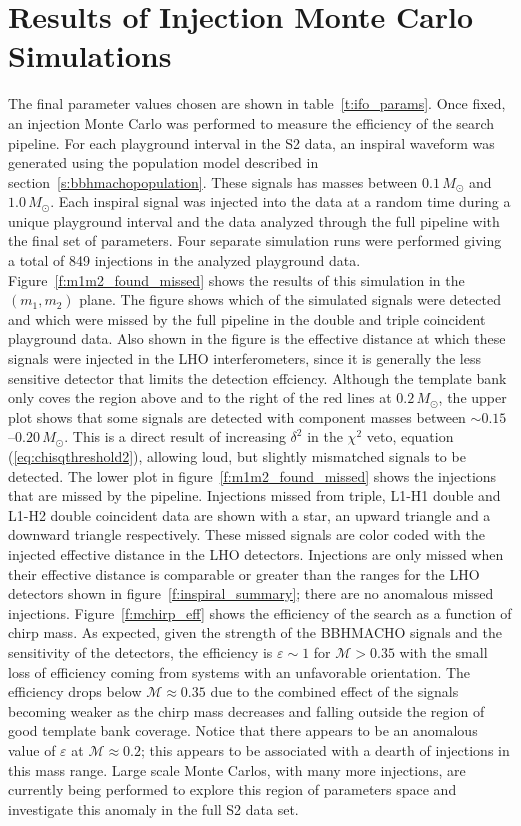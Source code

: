 \section{Results of Injection Monte Carlo Simulations}
\label{s:monte}

The final parameter values chosen are shown in table~\ref{t:ifo_params}. Once
fixed, an injection Monte Carlo was performed to measure the efficiency of the
search pipeline. For each playground interval in the S2 data, an inspiral
waveform was generated using the population model described in
section~\ref{s:bbhmachopopulation}. These signals has masses between
$0.1\,M_\odot$ and $1.0\,M_\odot$. Each inspiral signal was injected into the
data at a random time during a unique playground interval and the data
analyzed through the full pipeline with the final set of parameters. Four
separate simulation runs were performed giving a total of 849 injections in
the analyzed playground data.  Figure~\ref{f:m1m2_found_missed} shows the
results of this simulation in the $(m_1,m_2)$ plane. The figure shows which of
the simulated signals were detected and which were missed by the full pipeline
in the double and triple coincident playground data. Also shown in the figure
is the effective distance at which these signals were injected in the LHO
interferometers, since it is generally the less sensitive detector that limits
the detection effciency.  Although the template bank only coves the region
above and to the right of the red lines at $0.2\,M_\odot$, the upper plot
shows that some signals are detected with component masses between $\sim
0.15$--$0.20\,M_\odot$. This is a direct result of increasing $\delta^2$ in
the $\chi^2$ veto, equation (\ref{eq:chisqthreshold2}), allowing loud, but
slightly mismatched signals to be detected. The lower plot in
figure~\ref{f:m1m2_found_missed} shows the injections that are missed by
the pipeline. Injections missed from triple, L1-H1 double and L1-H2 double
coincident data are shown with a star, an upward triangle and a downward
triangle respectively. These missed signals are color coded with the injected
effective distance in the LHO detectors. Injections are
only missed when their effective distance is comparable or greater than the
ranges for the LHO detectors shown in figure~\ref{f:inspiral_summary}; there
are no anomalous missed injections.  Figure~\ref{f:mchirp_eff} shows the
efficiency of the search as a function of chirp mass. As expected, given the
strength of the BBHMACHO signals and the sensitivity of the detectors, the
efficiency is $\varepsilon \sim 1$ for $\mathcal{M} >0.35$ with the small loss
of efficiency coming from systems with an unfavorable orientation. The
efficiency drops below $\mathcal{M} \approx 0.35$ due to the combined effect
of the signals becoming weaker as the chirp mass decreases and falling outside
the region of good template bank coverage.  Notice that there appears to be an
anomalous value of $\varepsilon$ at $\mathcal{M} \approx 0.2$; this appears to
be associated with a dearth of injections in this mass range.  Large scale
Monte Carlos, with many more injections, are currently being performed to
explore this region of parameters space and investigate this anomaly in the
full S2 data set.

